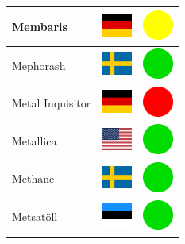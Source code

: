 \documentclass[12pt, a4paper, twoside]{report}
\begin{document}
\begin{center}
\begin{longtable}{|p{5cm}|p{2cm}|p{2cm}|}
 Membaris                                                   & \includegraphics[width=1cm]{../4x3/de} &   \includegraphics[width=1cm]{../likes/m} \\ \hline
 Mephorash                                                  & \includegraphics[width=1cm]{../4x3/se} &   \includegraphics[width=1cm]{../likes/y} \\ \hline
 Metal Inquisitor                                           & \includegraphics[width=1cm]{../4x3/de} &   \includegraphics[width=1cm]{../likes/n} \\ \hline
 Metallica                                                  & \includegraphics[width=1cm]{../4x3/us} &   \includegraphics[width=1cm]{../likes/y} \\ \hline
 Methane                                                    & \includegraphics[width=1cm]{../4x3/se} &   \includegraphics[width=1cm]{../likes/y} \\ \hline
 Metsatöll                                                  & \includegraphics[width=1cm]{../4x3/ee} &   \includegraphics[width=1cm]{../likes/y} \\ \hline

\end{longtable}
\end{center}
\end{document}

